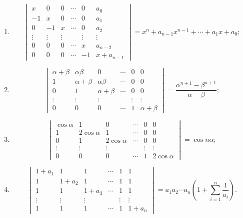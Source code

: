 \begin{enumerate}
\begin{enumerate}
\[\begin{vmatrix}
      1&0&a_2&\cdots&0\\
      \vdots&\vdots&\vdots&&\vdots\\
      1&0&0&\cdots&a_n
    \end{vmatrix}
    =a_1a_2\cdots a_n\left(a_0-\sum_{i=1}^n\frac{1}{a_i}\right);
    \]
  \anssub
    \item \[
    \begin{vmatrix}
      x&0&0&\cdots&0&a_0\\
      -1&x&0&\cdots&0&a_1\\
      0&-1&x&\cdots&0&a_2\\
      \vdots&\vdots&\vdots&&\vdots&\vdots\\
      0&0&0&\cdots&x&a_{n-2}\\
      0&0&0&\cdots&-1&x+a_{n-1}
    \end{vmatrix}
    =x^n+a_{n-1}x^{n-1}+\cdots+a_1x+a_0;
    \]
  \anssub
    \item \[
    \begin{vmatrix}
      \alpha+\beta&\alpha\beta&0&\cdots&0&0\\
      1&\alpha+\beta&\alpha\beta&\cdots&0&0\\
      0&1&\alpha+\beta&\cdots&0&0\\
      \vdots&\vdots&\vdots&&\vdots&\vdots\\
      0&0&0&\cdots&1&\alpha+\beta
    \end{vmatrix}
    =\frac{\alpha^{n+1}-\beta^{n+1}}{\alpha-\beta};
    \]
  \anssub
    \item \[
    \begin{vmatrix}
      \cos\alpha&1&0&\cdots&0&0\\
      1&2\cos\alpha&1&\cdots&0&0\\
      0&1&2\cos\alpha&\cdots&0&0\\
      \vdots&\vdots&\vdots&&\vdots&\vdots\\
      0&0&0&\cdots&1&2\cos\alpha
    \end{vmatrix}
    =\cos n\alpha;
    \]
  \anssub
    \item \[
    \begin{vmatrix}
      1+a_1&1&1&\cdots&1&1\\
      1&1+a_2&1&\cdots&1&1\\
      1&1&1+a_3&\cdots&1&1\\
      \vdots&\vdots&\vdots&&\vdots&\vdots\\
      1&1&1&\cdots&1&1+a_n
    \end{vmatrix}
    =a_1a_2\cdots a_n\left(1+\sum_{i=1}^n\frac{1}{a_i}\right).
\]
\end{enumerate}
\end{enumerate}
